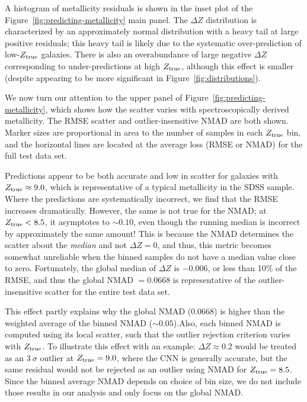 \documentclass[fleqn,usenatbib]{mnras}
\begin{document}
A histogram of metallicity residuals is shown in the inset plot of the Figure~\ref{fig:predicting-metallicity} main panel. The $\Delta Z$ distribution is characterized by an approximately normal distribution with a heavy tail at large positive residuals; this heavy tail is likely due to the systematic over-prediction of low-$Z_{\rm true}$ galaxies.
There is also an overabundance of large negative $\Delta Z$ corresponding to under-predictions at high $Z_{\rm true}$, although this effect is smaller (despite appearing to be more significant in Figure~\ref{fig:distributions}).

We now turn our attention to the upper panel of Figure~\ref{fig:predicting-metallicity}, which shows how the scatter varies with spectroscopically derived metallicity. The RMSE scatter and outlier-insensitive NMAD are both shown. Marker sizes are proportional in area to the number of samples in each $Z_{\rm true}$ bin, and the horizontal lines are located at the average loss (RMSE or NMAD) for the full test data set.

Predictions appear to be both accurate and low in scatter for galaxies with $Z_{\rm true} \approx 9.0$, which is representative of a typical metallicity in the SDSS sample. Where the predictions are systematically incorrect, we find that the RMSE increases dramatically. However, the same is not true for the NMAD; at $Z_{\rm true} < 8.5$, it asymptotes to $\sim 0.10$, even though the running median is incorrect by approximately the same amount! This is because the NMAD determines the scatter about the \textit{median} and not $\Delta Z = 0$, and thus, this metric becomes somewhat unreliable when the binned samples do not have a median value close to zero. Fortunately, the global median of $\Delta Z$ is $-0.006$, or less than 10\% of the RMSE, and thus the global NMAD $= 0.0668$ is representative of the outlier-insensitive scatter for the entire test data set.

This effect partly explains why the global NMAD (0.0668) is higher than the weighted average of the binned NMAD ($\sim 0.05$).Also, each binned NMAD is computed using its local scatter, such that the outlier rejection criterion varies with $Z_{\rm true}$. To illustrate this effect with an example: $\Delta Z \approx 0.2$ would be treated as an $3~\sigma$ outlier at $Z_{\rm true} = 9.0$, where the CNN is generally accurate, but the same residual would not be rejected as an outlier using NMAD for $Z_{\rm true} = 8.5$.
Since the binned average NMAD depends on choice of bin size, we do not include those results in our analysis and only focus on the global NMAD.
\end{document}
